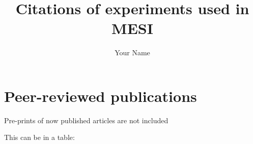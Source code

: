 \documentclass{report}
\begin{document}
\pagestyle{headings}

% 

\title{Citations of experiments used in MESI}
\author{Your Name} 

\maketitle


\section{Peer-reviewed publications}

Pre-prints of now published articles are not included

% 

This can be in a table:

\cite{bachofen24newphyt}



\end{document}
